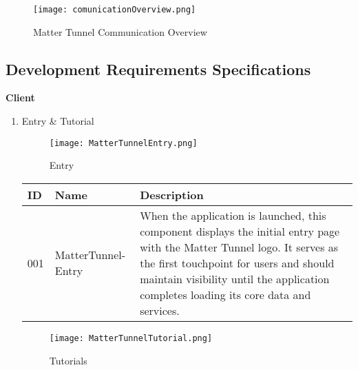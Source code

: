 \documentclass[conference]{IEEEtran}
\begin{document}
\begin{figure}[h!]
	\centering
	\texttt{[image: comunicationOverview.png]}
	\caption{Matter Tunnel Communication Overview}
	\label{fig:MatterTunnelCommunicationOverview}
\end{figure}

\subsection{Development Requirements Specifications}
\vspace{0.5cm}
{\centering \textbf{Client} \par}
\vspace{0.5cm}

\begin{enumerate}[itemsep=2ex, parsep=1ex]
	\item Entry \& Tutorial
	      
	      \begin{figure}[h!]
	      	\centering
	      	\texttt{[image: MatterTunnelEntry.png]}
	      	\caption{Entry}
	      	\label{fig:MatterTunnelEntry}
	      \end{figure}
          
	      \begin{table}[h!]
	      	\def\arraystretch{1.24} \small
	      	\begin{tabular}{|p{1.2cm}|p{2.5cm}|p{4.0cm}|}
	      		\hline
	      		ID  & Name               & Description                                                                                                                                                                                                                                                  \\
	      		\hline
	      		001 & MatterTunnel-Entry & When the application is launched, this component displays the initial entry page with the Matter Tunnel logo. It serves as the first touchpoint for users and should maintain visibility until the application completes loading its core data and services. \\
	      		\hline
	      	\end{tabular}
	      \end{table}
	      
	      \begin{figure}[h!]
	      	\centering
	      	\texttt{[image: MatterTunnelTutorial.png]}
	      	\caption{Tutorials}
	      	\label{fig:MatterTunnelTutorials}
	      \end{figure}
	                

\end{enumerate}
\end{document}
